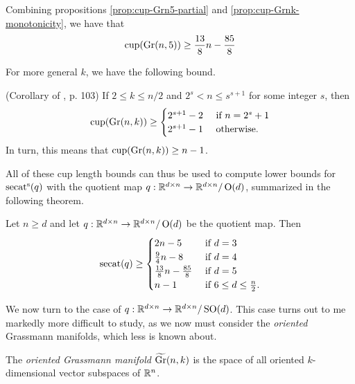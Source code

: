 \begin{corollary}
    Combining propositions \ref{prop:cup-Grn5-partial} and \ref{prop:cup-Grnk-monotonicity}, we have that
    \[
        \operatorname{cup}(\operatorname{Gr}(n,5)) \geq \frac{13}{8} n - \frac{85}{8}
    \]
\end{corollary}

For more general $k$, we have the following bound.

\begin{proposition}\label{prop:cup-Grnk-bound}
    (Corollary of \cite{stong1982}, p. 103)
    If $2 \leq k \leq n/2$ and $2^s < n \leq s^{s+1}$ for some integer $s$, then
    \[
        \operatorname{cup}(\operatorname{Gr}(n,k))
        \geq \begin{cases}
            2^{s+1} - 2 &\text{ if } n = 2^s+1 \\
            2^{s+1} - 1 &\text{ otherwise}.
        \end{cases}
    \]
    In turn, this means that $\operatorname{cup}(\operatorname{Gr}(n,k)) \geq n-1$.
\end{proposition}

All of these cup length bounds can thus be used to compute lower bounds for $\operatorname{secat^s}(q)$ with the quotient map $q :\mathbb{R}^{d \times n} \to \mathbb{R}^{d \times n}/\operatorname{O}(d)$, summarized in the following theorem.

\begin{theorem}\label{ref:Od-secat-lower-bounds}
    Let $n \geq d$ and let $q : \mathbb{R}^{d \times n} \to \mathbb{R}^{d \times n}/\operatorname{O}(d)$ be the quotient map.
    Then
    \[
        \operatorname{secat}(q)
        \geq \begin{cases}
            2n - 5 &\text{ if } d = 3 \\
            \frac{9}{4}n - 8 &\text{ if } d = 4 \\
            \frac{13}{8}n - \frac{85}{8} &\text{ if } d = 5 \\
            n - 1 &\text{ if } 6 \leq d \leq \frac{n}{2}.
        \end{cases}
    \]
\end{theorem}


We now turn to the case of $q : \mathbb{R}^{d \times n} \to \mathbb{R}^{d \times n}/\operatorname{SO}(d)$.
This case turns out to me markedly more difficult to study, as we now must consider the \emph{oriented} Grassmann manifolds, which less is known about.

\begin{definition}
    The \emph{oriented Grassmann manifold} $\widetilde{\operatorname{Gr}}(n,k)$ is the space of all oriented $k$-dimensional vector subspaces of $\mathbb{R}^n$.
\end{definition}

